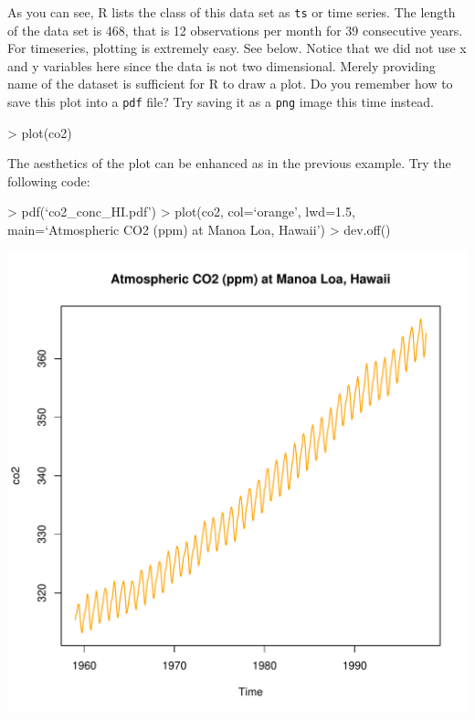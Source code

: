 \documentclass[11pt,twosided]{article}
\begin{document}
As you can see, R lists the class of this data set as {\tt ts} or time series.  The length of the data set is 468, that is 12 observations per month for 39 consecutive years.  For timeseries, plotting is extremely easy.  See below.  Notice that we did not use x and y variables here since the data is not two dimensional.  Merely providing name of the dataset is sufficient for R to draw a plot.  Do you remember how to save this plot into a {\tt pdf} file?  Try saving it as a {\tt png} image this time instead.\\

\begin{tcolorbox}[breakable,boxrule=0.5pt,enhanced]
\begin{code}
> plot(co2)
\end{code}
\end{tcolorbox}
\vspace{2ex}

The aesthetics of the plot can be enhanced as in the previous example.  Try the following code:\\

\begin{tcolorbox}[breakable,boxrule=0.5pt,enhanced]
\begin{code}
> pdf(`co2_conc_HI.pdf')
> plot(co2, col=`orange', lwd=1.5, main=`Atmospheric CO2 (ppm) at Manoa Loa, Hawaii')
> dev.off()
\end{code}
\end{tcolorbox}


\begin{center}
\includegraphics[width=6in]{co2_conc_HI}
\end{center}
\end{document}
